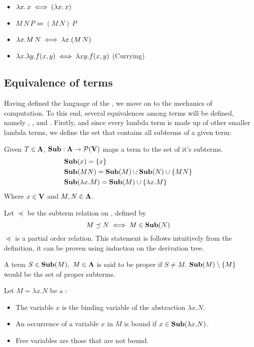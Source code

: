 \begin{itemize}
\item \( \lambda x . \, x \iff ( \lambda x . \, x ) \)
\item \( M \, N \, P \iff (M \, N) \, P \)
\item \( \lambda x. M \, N \iff \lambda x. (M \, N) \)
\item \( \lambda x. \lambda y. f(x,y) \iff \lambda xy. f(x,y) \) (Currying)
\end{itemize}
\subsection{\centering Equivalence of terms}
Having defined the language of the \lcalc, we move on to the mechanics of computation. To this end, several equivalences among terms will be defined, namely \aequiv, \bequiv, and \etaequiv. Firstly, and since every lambda term is made up of other smaller lambda terms, we define the set that contains all subterms of a given term:
\begin{definition} Given $T \in \mathbf{\Lambda}$, $\mathbf{Sub} : \mathbf{\Lambda} \to \mathcal{P}(\mathbf{V})$ maps a term to the set of it's subterms.
  \begin{align*}
    &\mathbf{Sub}(x) = \{x\} \\
    &\mathbf{Sub}(MN) = \mathbf{Sub}(M)  \cup \mathbf{Sub}(N) \cup \{MN\} \\
    &\mathbf{Sub}(\lambda x . M) = \mathbf{Sub}(M)  \cup \{\lambda x. M\}
  \end{align*}
  Where $x \in \mathbf{V}$ and $M, N \in \mathbf{\Lambda} $.

\end{definition}
\begin{remark}
  Let \( \preceq \) be the subterm relation on \lterms, defined by
  \[
    M \preceq N \iff M \in \mathbf{Sub}( N )
  \]
  \( \preceq \) is a partial order relation. This statement is follows intuitively from the definition, it can be proven using induction on the derivation tree.
\end{remark}
\begin{definition} A term $ S \in \mathbf{Sub}(M), \ M \in \mathbf{\Lambda}$ is said to be proper if $S \neq M$. $\mathbf{Sub}(M) \setminus \{M\}$ would be the set of proper subterms.
\end{definition}
\begin{definition} Let \( M = \lambda x. N \) be a \lterm:
  \begin{itemize}
  \item The variable \( x \) is the binding variable of the abstraction \( \lambda x. N \).
  \item An occurrence of a variable \( x \) in \( M \) is bound if \( x \in \mathbf{Sub}( \lambda x. N ) \).
  \item Free variables are those that are not bound.
  \end{itemize}
\end{definition}
